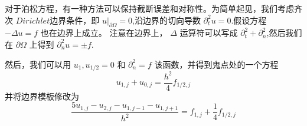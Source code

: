 \documentclass[12pt,a4paper]{article}
\begin{document}
对于泊松方程，有一种方法可以保持截断误差和对称性。为简单起见，我们考虑齐次 $Dirichlet$边界条件，即 $u|_{\partial\Omega}=0$,沿边界的切向导数 $\partial ^2_t u=0$.假设方程 $-\Delta u= f$ 也在边界上成立。 注意在边界上，
$\Delta$ 运算符可以写成 $\partial ^2_t+\partial ^2_n$,然后我们在 $\partial\Omega$ 上得到 $\partial ^2_n u=\pm f$.

然后，我们可以用 $u_1,u_{1/2}=0$ 和 $\partial ^2_n=f$ 该函数，并得到鬼点处的一个方程
$$
u_{1,j}+u_{0,j}=\frac{h^2}{4}f_{1/2,j}
$$
并将边界模板修改为
$$
\frac{5u_{1,j}-u_{2,j}-u_{1,j-1}-u_{1,j+1}}{h^2}=f_{1,j}+\frac{1}{4}f_{1/2,j}
$$













%

%
\end{document}
